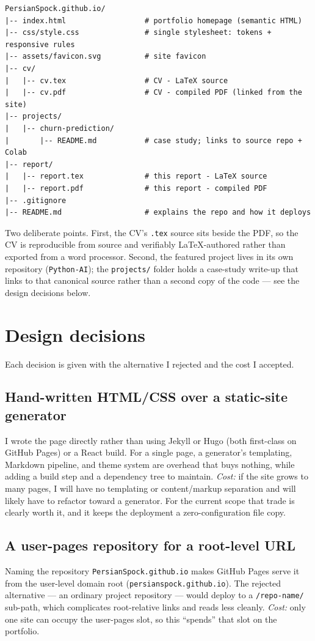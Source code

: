 \documentclass[11pt,a4paper]{article}
\begin{document}
\begin{verbatim}
PersianSpock.github.io/
|-- index.html                  # portfolio homepage (semantic HTML)
|-- css/style.css               # single stylesheet: tokens + responsive rules
|-- assets/favicon.svg          # site favicon
|-- cv/
|   |-- cv.tex                  # CV - LaTeX source
|   |-- cv.pdf                  # CV - compiled PDF (linked from the site)
|-- projects/
|   |-- churn-prediction/
|       |-- README.md           # case study; links to source repo + Colab
|-- report/
|   |-- report.tex              # this report - LaTeX source
|   |-- report.pdf              # this report - compiled PDF
|-- .gitignore
|-- README.md                   # explains the repo and how it deploys
\end{verbatim}

Two deliberate points. First, the CV's \texttt{.tex} source sits beside the PDF,
so the CV is reproducible from source and verifiably LaTeX-authored rather than
exported from a word processor. Second, the featured project lives in its own
repository (\texttt{Python-AI}); the \texttt{projects/} folder holds a case-study
write-up that links to that canonical source rather than a second copy of the
code --- see the design decisions below.

\section{Design decisions}

Each decision is given with the alternative I rejected and the cost I accepted.

\subsection{Hand-written HTML/CSS over a static-site generator}
I wrote the page directly rather than using Jekyll or Hugo (both first-class on
GitHub Pages) or a React build. For a single page, a generator's templating,
Markdown pipeline, and theme system are overhead that buys nothing, while adding
a build step and a dependency tree to maintain. \emph{Cost:} if the site grows to
many pages, I will have no templating or content/markup separation and will
likely have to refactor toward a generator. For the current scope that trade is
clearly worth it, and it keeps the deployment a zero-configuration file copy.

\subsection{A user-pages repository for a root-level URL}
Naming the repository \texttt{PersianSpock.github.io} makes GitHub Pages serve it
from the user-level domain root (\texttt{persianspock.github.io}). The rejected
alternative --- an ordinary project repository --- would deploy to a
\texttt{/repo-name/} sub-path, which complicates root-relative links and reads
less cleanly. \emph{Cost:} only one site can occupy the user-pages slot, so this
``spends'' that slot on the portfolio.
\end{document}
